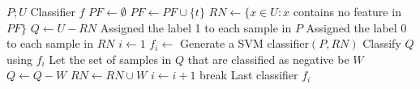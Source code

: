 \documentclass{article}
\begin{document}
\begin{algorithm}[!h]
\renewcommand{\algorithmicrequire}{\textbf{Input:}} %
\renewcommand{\algorithmicensure}{\textbf{Output:}} %
	\caption{PEBL} %
	\begin{algorithmic}[1] %
	    \REQUIRE
	    $P;U$
	    \ENSURE
	    Classifier $f$
	    \STATE $PF\leftarrow \emptyset$ %
	    \STATE $PF\leftarrow PF\cup \{t\}$
	    \ENDIF
	    \ENDFOR
	    \STATE $RN\leftarrow \{x\in U: x$ contains no feature in $PF\}$ %
	    \STATE $Q\leftarrow U-RN$
	    \STATE Assigned the label 1 to each sample in $P$
	    \STATE Assigned the label 0 to each sample in $RN$
	    \STATE $i\leftarrow 1$
	    \STATE $f_i\leftarrow$ Generate a SVM classifier$(P,RN)$
	    \STATE Classify $Q$ using $f_i$
	    \STATE Let the set of samples in $Q$ that are classified as negative be $W$
	    \STATE $Q\leftarrow Q-W$
	    \STATE $RN\leftarrow RN\cup W$
	    \STATE $i\leftarrow i+1$
	    \ELSE
	    \STATE break
	    \ENDIF
	    \ENDWHILE
		\RETURN Last classifier $f_i$
	\end{algorithmic}
\end{algorithm}
\end{document}
